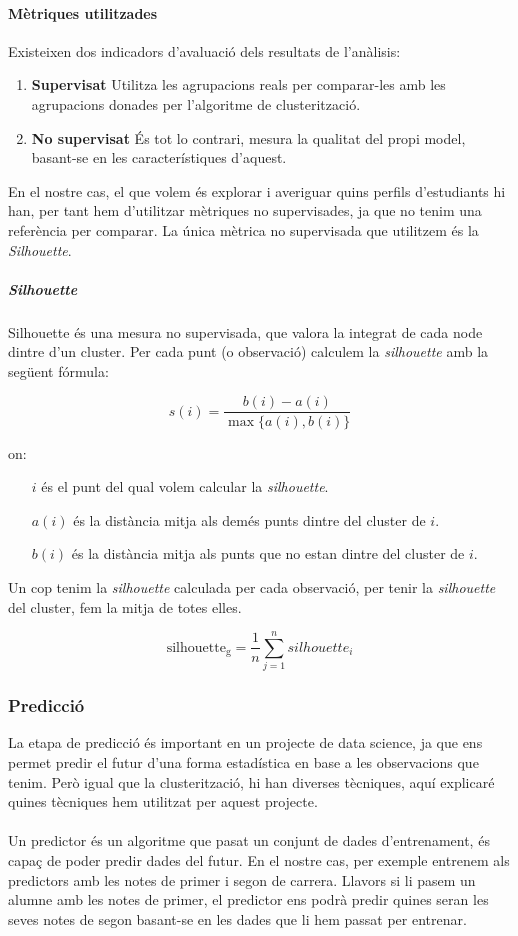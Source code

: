 \documentclass[12pt,a4paper,catalan]{article}
\begin{document}
\newpage

\paragraph{Mètriques utilitzades}
Existeixen dos indicadors d'avaluació dels resultats de l'anàlisis:
\begin{enumerate}
	\item \textbf{Supervisat} Utilitza les agrupacions reals per comparar-les amb les agrupacions donades per l'algoritme de clusterització.
	\item \textbf{No supervisat} És tot lo contrari, mesura la qualitat del propi model, basant-se en les característiques d'aquest.
\end{enumerate}

En el nostre cas, el que volem és explorar i averiguar quins perfils d'estudiants hi han, per tant hem d'utilitzar mètriques no supervisades, ja que no tenim una referència per comparar. La única mètrica no supervisada que utilitzem és la \textit{Silhouette}.

\subparagraph{\textit{Silhouette}}
Silhouette \cite{silhouette} és una mesura no supervisada, que valora la integrat de cada node dintre d'un cluster. Per cada punt (o observació) calculem la \textit{silhouette} amb la següent fórmula:

$$ s(i) = \frac{b(i) - a(i)}{\max\{a(i),b(i)\}} $$

on:
\begin{itemize}[leftmargin=.5in]
	\item [$i$] és el punt del qual volem calcular la \textit{silhouette}.
	\item [$a(i)$] és la distància mitja als demés punts dintre del cluster de $i$.
	\item [$b(i)$] és la distància mitja als punts que no estan dintre del cluster de $i$.
\end{itemize}

Un cop tenim la \textit{silhouette} calculada per cada observació, per tenir la \textit{silhouette} del cluster, fem la mitja de totes elles.

$$ \mathrm{silhouette_g} = \frac{1}{n} \sum_{j=1}^n silhouette_i $$

\newpage


\subsubsection{Predicció}
\label{subsec:predictors}
La etapa de predicció és important en un projecte de data science, ja que ens permet predir el futur d'una forma estadística en base a les observacions que tenim. Però igual que la clusterització, hi han diverses tècniques, aquí explicaré quines tècniques hem utilitzat per aquest projecte.
\\
\\
Un predictor és un algoritme que pasat un conjunt de dades d'entrenament, és capaç de poder predir dades del futur. En el nostre cas, per exemple entrenem als predictors amb les notes de primer i segon de carrera. Llavors si li pasem un alumne amb les notes de primer, el predictor ens podrà predir quines seran les seves notes de segon basant-se en les dades que li hem passat per entrenar.
\end{document}
